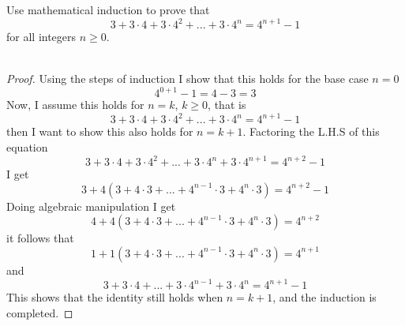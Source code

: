\documentclass[titlepage]{article}
\newenvironment{problem}[2][Problem]{\begin{trivlist}
\item[\hskip \labelsep {\bfseries #1}\hskip \labelsep {\bfseries #2.}]}{\end{trivlist}}
\begin{document}
 
 
\fancyhf{}
\cfoot{\thepage}

\begin{problem}{1}
	Use mathematical induction to prove that
	$$ 3 + 3\cdot4 + 3\cdot4^2 + ... + 3\cdot4^n = 4^{n+1} - 1$$
	for all integers $n \geq 0$. 
	\\ \\
	\begin{proof}
		Using the steps of induction I show that this holds for the base case $n=0$
		$$4^{0+1}-1 = 4-3 = 3$$
	Now, I assume this holds for $n=k$, $k \geq 0$, that is 
	$$3 + 3\cdot4 + 3\cdot4^2 + ... + 3\cdot4^n = 4^{n+1} - 1 $$
	 then I want to show this also holds for $n=k+1$.
	 Factoring the L.H.S of this equation
$$3+3\cdot4+3\cdot4^2+...+3\cdot4^n+3\cdot4^{n+1} = 4^{n+2}-1$$
I get
$$3+4(3+4\cdot3+...+4^{n-1}\cdot3+4^{n}\cdot3) = 4^{n+2}-1$$
Doing algebraic manipulation I get
$$4+4(3+4\cdot3+...+4^{n-1}\cdot3+4^{n}\cdot3) = 4^{n+2}$$
it follows that
$$1+1(3+4\cdot3+...+4^{n-1}\cdot3+4^{n}\cdot3) = 4^{n+1}$$
and 
$$3+3\cdot4+...+3\cdot4^{n-1} + 3\cdot4^n = 4^{n+1} - 1$$
This shows that the identity still holds when $n=k+1$, and the induction is completed.
\end{proof}
\end{problem}
\end{document}
